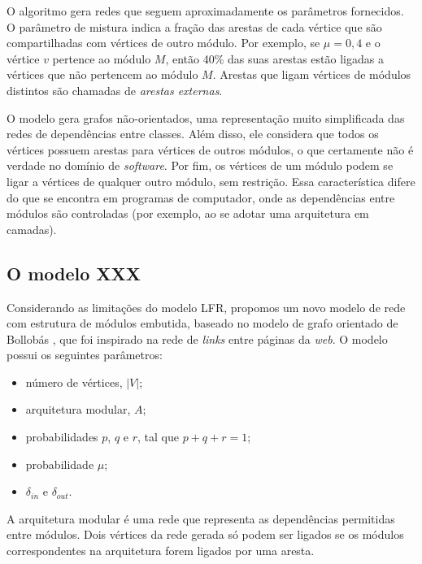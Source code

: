\documentclass{acm_proc_article-sp}
\begin{document}
O algoritmo gera redes que seguem aproximadamente os parâmetros fornecidos. O parâmetro de mistura indica a fração das arestas de cada vértice que são compartilhadas com vértices de outro módulo. Por exemplo, se $\mu = 0,4$ e o vértice $v$ pertence ao módulo $M$, então 40\% das suas arestas estão ligadas a vértices que não pertencem ao módulo $M$. Arestas que ligam vértices de módulos distintos são chamadas de \emph{arestas externas}. %


  O modelo gera grafos não-orientados, uma representação muito simplificada das redes de dependências entre classes. Além disso, ele considera que todos os vértices possuem arestas para vértices de outros módulos, o que certamente não é verdade no domínio de \emph{software}. Por fim, os vértices de um módulo podem se ligar a vértices de qualquer outro módulo, sem restrição. Essa característica difere do que se encontra em programas de computador, onde as dependências entre módulos são controladas (por exemplo, ao se adotar uma arquitetura em camadas).

\subsection{O modelo XXX}

Considerando as limitações do modelo LFR, propomos um novo modelo de rede com estrutura de módulos embutida, baseado no modelo de grafo orientado de Bollobás \cite{Bollobas2003}, que foi inspirado na rede de \emph{links} entre páginas da \emph{web}. O modelo possui os seguintes parâmetros:

\begin{itemize}
  \item número de vértices, $|V|$;
  \item arquitetura modular, $A$;
  \item probabilidades $p$, $q$ e $r$, tal que $p + q + r = 1$;
  \item probabilidade $\mu$;
  \item $\delta_{in}$ e $\delta_{out}$.
\end{itemize}

A arquitetura modular é uma rede que representa as dependências permitidas entre módulos. Dois vértices da rede gerada só podem ser ligados se os módulos correspondentes na arquitetura forem ligados por uma aresta.
\end{document}
